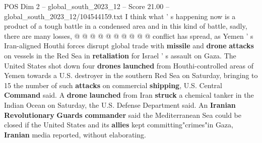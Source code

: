 \begin{textsample}{POS Dim 2 – global\_south\_2023\_12 – Score 21.00 – global\_south\_2023\_12/104544159.txt}
I think what ' s happening now is a product of a tough battle in a condensed area and in this kind of battle, sadly, there are many losses, @ @ @ @ @ @ @ @ @ @ conflict has spread, as Yemen ' s Iran-aligned Houthi forces disrupt global trade with \textbf{missile} and \textbf{drone} \textbf{attacks} on vessels in the Red Sea in \textbf{retaliation} for Israel ' s assault on Gaza.
The United States shot down four \textbf{drones} \textbf{launched} from Houthi-controlled areas of Yemen towards a U.S. destroyer in the southern Red Sea on Saturday, bringing to 15 the number of such \textbf{attacks} on commercial \textbf{shipping}, U.S.
Central \textbf{Command} said.
A \textbf{drone} \textbf{launched} from Iran \textbf{struck} a chemical tanker in the Indian Ocean on Saturday, the U.S.
Defense Department said.
An \textbf{Iranian} \textbf{Revolutionary} \textbf{Guards} \textbf{commander} said the Mediterranean Sea could be closed if the United States and its \textbf{allies} kept committing"crimes"in Gaza, \textbf{Iranian} media reported, without elaborating.

\end{textsample}
